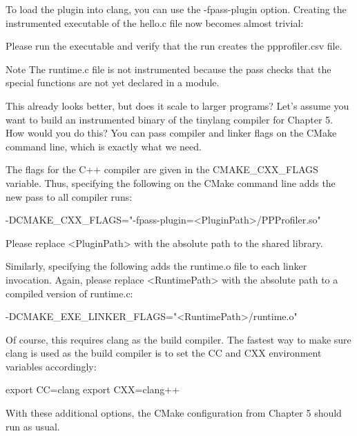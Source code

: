 To load the plugin into clang, you can use the -fpass-plugin option. Creating the instrumented executable of the hello.c file now becomes almost trivial:


Please run the executable and verify that the run creates the ppprofiler.csv file.

\begin{myNotic}{Note}
The runtime.c file is not instrumented because the pass checks that the special functions are not yet declared in a module.
\end{myNotic}

This already looks better, but does it scale to larger programs? Let’s assume you want to build an instrumented binary of the tinylang compiler for Chapter 5. How would you do this? You can pass compiler and linker flags on the CMake command line, which is exactly what we need.

The flags for the C++ compiler are given in the CMAKE\_CXX\_FLAGS variable. Thus, specifying the following on the CMake command line adds the new pass to all compiler runs:

\begin{shell}
-DCMAKE_CXX_FLAGS="-fpass-plugin=<PluginPath>/PPProfiler.so"
\end{shell}

Please replace <PluginPath> with the absolute path to the shared library.

Similarly, specifying the following adds the runtime.o file to each linker invocation. Again, please replace <RuntimePath> with the absolute path to a compiled version of runtime.c:

\begin{shell}
-DCMAKE_EXE_LINKER_FLAGS="<RuntimePath>/runtime.o"
\end{shell}

Of course, this requires clang as the build compiler. The fastest way to make sure clang is used as the build compiler is to set the CC and CXX environment variables accordingly:

\begin{shell}
export CC=clang
export CXX=clang++
\end{shell}

With these additional options, the CMake configuration from Chapter 5 should run as usual.

